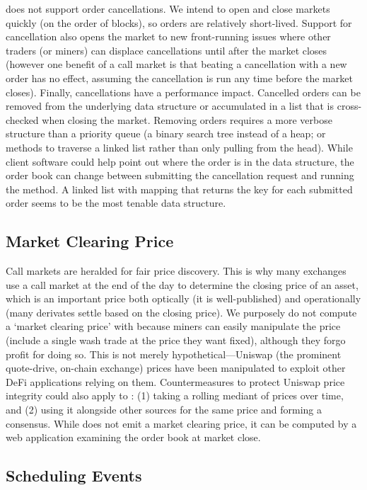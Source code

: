 \cm does not support order cancellations. We intend to open and close markets quickly (on the order of blocks), so orders are relatively short-lived. Support for cancellation also opens the market to new front-running issues where other traders (or miners) can displace cancellations until after the market closes (however one benefit of a call market is that beating a cancellation with a new order has no effect, assuming the cancellation is run any time before the market closes). Finally, cancellations have a performance impact. Cancelled orders can be removed from the underlying data structure   or accumulated in a list that is cross-checked when closing the market. Removing orders requires a more verbose structure than a priority queue (\eg a binary search tree instead of a heap; or methods to traverse a linked list rather than only pulling from the head). While client software could help point out where the order is in the data structure, the order book can change between submitting the cancellation request and running the method. A linked list with mapping that returns the key for each submitted order seems to be the most tenable data structure. 

\subsection{Market Clearing Price}

Call markets are heralded for fair price discovery. This is why many exchanges use a call market at the end of the day to determine the closing price of an asset, which is an important price both optically (it is well-published) and operationally (many derivates settle based on the closing price). We purposely do not compute a `market clearing price' with \cm because miners can easily manipulate the price (\ie include a single wash trade at the price they want fixed), although they forgo profit for doing so. This is not merely hypothetical---Uniswap (the prominent quote-drive, on-chain exchange) prices have been manipulated to exploit other DeFi applications relying on them. Countermeasures to protect Uniswap price integrity could also apply to \cm: (1) taking a rolling mediant of prices over time, and (2) using it alongside other sources for the same price and forming a consensus. While \cm does not emit a market clearing price, it can be computed by a web application examining the order book at market close. 

\subsection{Scheduling Events}

